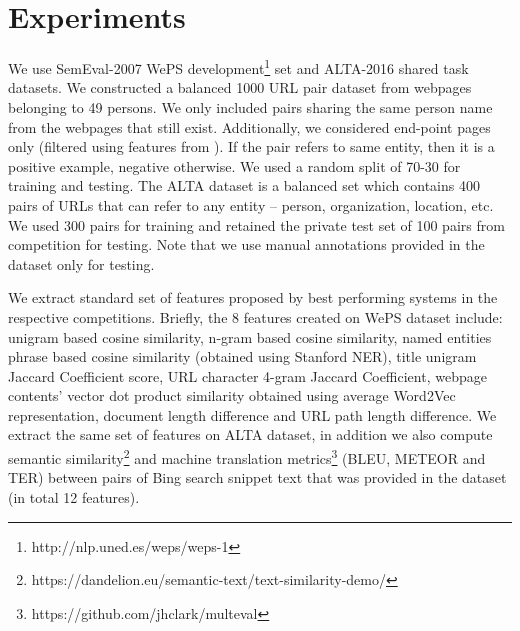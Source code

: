 \documentclass{sig-alternate-05-2015}
\begin{document}
\section{Experiments}
We use SemEval-2007 WePS development\footnote{http://nlp.uned.es/weps/weps-1} set and ALTA-2016 shared task datasets. We constructed a balanced 1000 URL pair dataset from webpages belonging to 49 persons. We only included pairs sharing the same person name from the webpages that still exist. Additionally, we considered end-point pages only (filtered using features from \cite{chisholm2016akbc}). If the pair refers to same entity, then it is a positive example, negative otherwise. We used a random split of 70-30 for training and testing. The ALTA dataset is a balanced set which contains 400 pairs of URLs that can refer to any entity -- person, organization, location, etc. We used 300 pairs for training and retained the private test set of 100 pairs from competition for testing. Note that we use manual annotations provided in the dataset only for testing.

We extract standard set of features proposed by best performing systems in the respective competitions. Briefly, the 8 features created on WePS dataset include: unigram based cosine similarity, n-gram based cosine similarity, named entities phrase based cosine similarity (obtained using Stanford NER), title unigram Jaccard Coefficient score, URL character 4-gram Jaccard Coefficient, webpage contents' vector dot product similarity obtained using average Word2Vec representation, document length difference and URL path length difference. We extract the same set of features on ALTA dataset, in addition we also compute semantic similarity\footnote{https://dandelion.eu/semantic-text/text-similarity-demo/} and machine translation metrics\footnote{https://github.com/jhclark/multeval} (BLEU, METEOR and TER) between pairs of Bing search snippet text that was provided in the dataset (in total 12 features).
\end{document}
